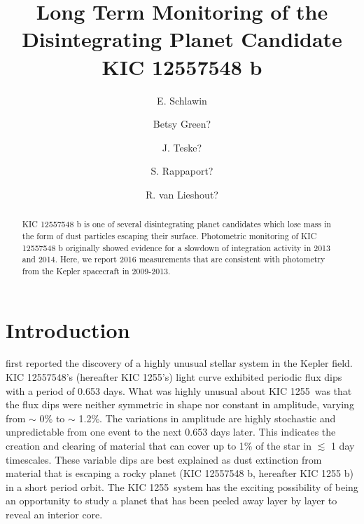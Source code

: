 \documentclass[twocolumn]{aastex61}
\newcommand{\sha}{KIC 1255 b}
\newcommand{\shStar}{KIC 1255}
\begin{document}
\title{Long Term Monitoring of the Disintegrating Planet Candidate KIC 12557548 b}



\author{E. Schlawin}

\author{Betsy Green?}

\author{J. Teske?}

\author{S. Rappaport?}

\author{R. van Lieshout?}

\begin{abstract}
KIC 12557548 b is one of several disintegrating planet candidates which lose mass in the form of dust particles escaping their surface. Photometric monitoring of KIC 12557548 b originally showed evidence for a slowdown of integration activity in 2013 and 2014. Here, we report 2016 measurements that are consistent with photometry from the Kepler spacecraft in 2009-2013.
\end{abstract}



\section{Introduction}
\citet{rappaport} first reported the discovery of a highly unusual stellar system in the Kepler field.
KIC 12557548's (hereafter \shStar's) light curve exhibited periodic flux dips with a period of 0.653 days.
What was highly unusual about \shStar\ was that the flux dips were neither symmetric in shape nor constant in amplitude, varying from $\sim$ 0\% to $\sim$ 1.2\%.
The variations in amplitude are highly stochastic and unpredictable from one event to the next 0.653 days later.
This indicates the creation and clearing of material that can cover up to 1\% of the star in $\lesssim$ 1 day timescales.
These variable dips are best explained as dust extinction from material that is escaping a rocky planet (KIC 12557548 b, hereafter \sha) in a short period orbit.
The \shStar\ system has the exciting possibility of being an opportunity to study a planet that has been peeled away layer by layer to reveal an interior core.
\end{document}
